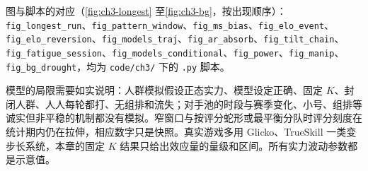 {\sloppy 图与脚本的对应（\cref{fig:ch3-longest} 至\cref{fig:ch3-bg}，按出现顺序）：\texttt{fig\_longest\_run}、\texttt{fig\_pattern\_window}、\texttt{fig\_ms\_bias}、\texttt{fig\_elo\_event}、\texttt{fig\_elo\_reversion}、\texttt{fig\_models\_traj}、\texttt{fig\_ar\_absorb}、\texttt{fig\_tilt\_chain}、\texttt{fig\_fatigue\_session}、\texttt{fig\_models\_conditional}、\texttt{fig\_power}、\texttt{fig\_manip}、\texttt{fig\_bg\_drought}，均为 \texttt{code/ch3/} 下的 \texttt{.py} 脚本。\par}

模型的局限需要如实说明：人群模拟假设正态实力、模型设定正确、固定 $K$、封闭人群、人人每轮都打、无组排和流失；对手池的时段与赛季变化、小号、组排等诚实但非平稳的机制都没有模拟。窄窗口与按评分蛇形或最平衡分队时评分刻度在统计期内仍在拉伸，相应数字只是快照。真实游戏多用 Glicko、TrueSkill 一类变步长系统，本章的固定 $K$ 结果只给出效应量的量级和区间。所有实力波动参数都是示意值。
